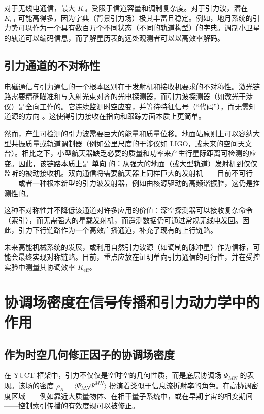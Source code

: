 \documentclass[12pt,a4paper]{article}
\newcommand{\Keff}{K_{\mathrm{eff}}}
\begin{document}
	对于无线电通信，最大 \(\Keff\) 受限于信道容量和调制复杂度。对于引力波，潜在 \(\Keff\) 可能高得多，因为字典（背景引力场）极其丰富且稳定。例如，地月系统的引力势可以作为一个具有数百万个不同状态（不同的轨道构型）的字典。调制小卫星的轨道可以编码信息，而了解星历表的远处观测者可以以高效率解码。
	
	\subsection{引力通道的不对称性}
	\label{subsec:asymmetry}
	
	电磁通信与引力通信的一个根本区别在于发射机和接收机要求的不对称性。激光链路需要精确瞄准和与入射光束对齐的光电探测器，而引力波探测器（如激光干涉仪）是全向工作的。它连续监测时空应变，并等待特征信号（“代码”），而无需知道源的方向 \cite{LIGO}。这使得引力接收在指向和跟踪方面本质上更简单。
	
	然而，产生可检测的引力波需要巨大的能量和质量位移。地面站原则上可以容纳大型共振质量或轨道调制器（例如公里尺度的干涉仪如 LIGO，或未来的空间天文台）。相比之下，小型航天器缺乏必要的质量和功率来产生行星际距离可检测的应变。因此，该链路本质上是 \textbf{单向} 的：从强大的地面（或大型轨道）发射机到仅仅监听的被动接收机。双向通信将需要航天器上同样巨大的发射机——目前不可行——或者一种根本新型的引力波发射器，例如由核源驱动的高频谐振腔，这仍是推测性的。
	
	这种不对称性并不降低该通道对许多应用的价值：深空探测器可以接收复杂命令（索引），而无需强大的星载发射机，而遥测数据仍可通过常规无线电发回。因此，引力下行链路作为一个高效广播通道，补充了现有的上行链路。
	
	未来高能机械系统的发展，或利用自然引力波源（如调制的脉冲星）作为信标，可能会最终实现对称链路。目前，重点应放在证明单向引力通信的可行性，并在受控实验中测量其协调效率 \(K_{\mathrm{eff}}\)。
	
	\section{协调场密度在信号传播和引力动力学中的作用}
	\label{sec:coord-density}
	
	\subsection{作为时空几何修正因子的协调场密度}
	
	在 YUCT 框架中，引力不仅仅是空时空的几何性质，而是底层协调场 \(\Psi_{MN}\) 的表现。该场的密度 \(\rho_K = \langle \Psi_{MN}\Psi^{MN} \rangle\) 扮演着类似于信息流折射率的角色。在高协调密度区域——例如靠近大质量物体、在相干量子系统中，或在早期宇宙的相变期间——控制索引传播的有效度规可以被修正。
	
\end{document}
